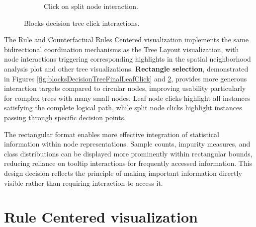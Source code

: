 \begin{figure}
\begin{subfigure}[c]{0.48\linewidth}
        \caption{Click on split node interaction.}
        \label{fig:blocksDecisionTreeFinalSplitClick}
    \end{subfigure}
    \caption{Blocks decision tree click interactions.}
\end{figure}

The Rule and Counterfactual Rules Centered visualization implements the same bidirectional coordination mechanisms as the Tree Layout visualization, with node interactions triggering corresponding highlights in the spatial neighborhood analysis plot and other tree visualizations. \textbf{Rectangle selection}, demonstrated in Figures \ref{fig:blocksDecisionTreeFinalLeafClick} and \ref{fig:blocksDecisionTreeFinalSplitClick}, provides more generous interaction targets compared to circular nodes, improving usability particularly for complex trees with many small nodes. Leaf node clicks highlight all instances satisfying the complete logical path, while split node clicks highlight instances passing through specific decision points.

The rectangular format enables more effective integration of statistical information within node representations. Sample counts, impurity measures, and class distributions can be displayed more prominently within rectangular bounds, reducing reliance on tooltip interactions for frequently accessed information. This design decision reflects the principle of making important information directly visible rather than requiring interaction to access it.

\section{Rule Centered visualization}


